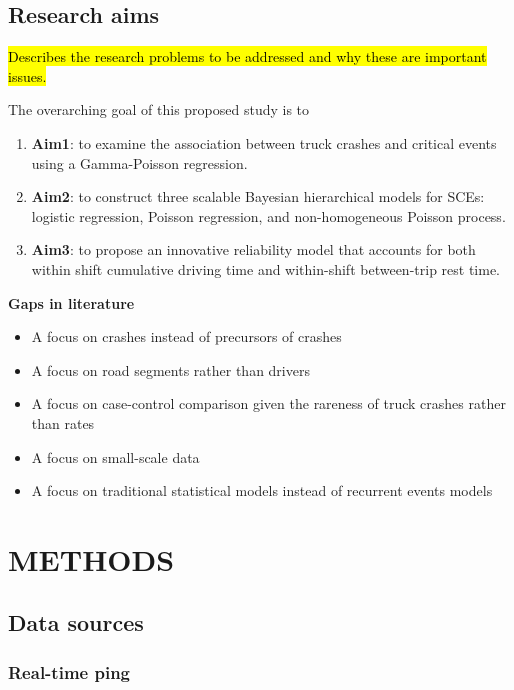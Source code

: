 \documentclass[12pt]{book}
\numberwithin{equation}{chapter}
\providecommand{\tightlist}{%
  \setlength{\itemsep}{0pt}\setlength{\parskip}{0pt}}
\begin{document}
\hypertarget{research-aims}{%
\section{Research aims}\label{research-aims}}

\hl{Describes the research problems to be addressed and why these are important issues.}

The overarching goal of this proposed study is to

\begin{enumerate}
\def\labelenumi{\arabic{enumi}.}
\item
  \textbf{Aim1}: to examine the association between truck crashes and critical events using a Gamma-Poisson regression.
\item
  \textbf{Aim2}: to construct three scalable Bayesian hierarchical models for SCEs: logistic regression, Poisson regression, and non-homogeneous Poisson process.
\item
  \textbf{Aim3}: to propose an innovative reliability model that accounts for both within shift cumulative driving time and within-shift between-trip rest time.
\end{enumerate}

\textbf{Gaps in literature}

\begin{itemize}
\tightlist
\item
  A focus on crashes instead of precursors of crashes
\item
  A focus on road segments rather than drivers
\item
  A focus on case-control comparison given the rareness of truck crashes rather than rates
\item
  A focus on small-scale data
\item
  A focus on traditional statistical models instead of recurrent events models
\end{itemize}

\hypertarget{methods}{%
\chapter{METHODS}\label{methods}}

\hypertarget{data-sources}{%
\section{Data sources}\label{data-sources}}

\hypertarget{real-time-ping}{%
\subsection{Real-time ping}\label{real-time-ping}}
\end{document}
